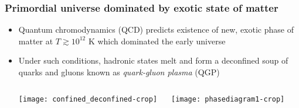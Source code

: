 \documentclass[svgnames]{beamer}
\begin{document}
\begin{frame}

\frametitle{Primordial universe dominated by exotic state of matter}
\vspace{-0.05 in}

\begin{itemize}
 \item Quantum chromodynamics (QCD) predicts existence of new, exotic phase of matter at $T \gtrsim 10^{12}$ K which dominated the early universe \\
 \vspace{0.05 in}
 \item Under such conditions, hadronic states melt and form a deconfined soup of quarks and gluons known as \emph{quark-gluon plasma} (QGP)
\end{itemize}
\vspace{0.05 in}

\begin{columns}[T]
 \begin{column}{0.05\textwidth}
 \end{column}
 \begin{column}{0.45\textwidth}
  \centering
  \vspace{-0.05 in} \texttt{[image: confined\_deconfined-crop]} \\
 \end{column}
 \begin{column}{0.45\textwidth}
  \centering
  \texttt{[image: phasediagram1-crop]}
  \vspace{0.05 in}
 \end{column}
 \begin{column}{0.05\textwidth}
 \end{column}
\end{columns}

\end{frame}
\end{document}

